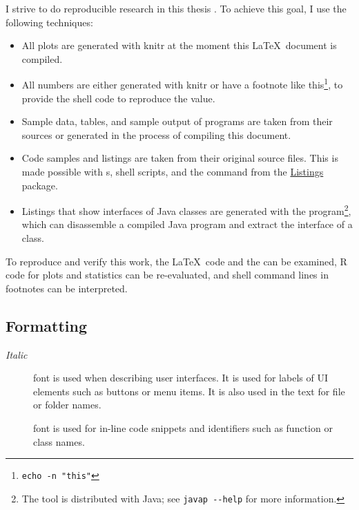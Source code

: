I strive to do reproducible research in this thesis
\citep{peng2011reproducible}.
To achieve this goal, I use the following techniques:

\begin{itemize}[noitemsep,nolistsep]

  \item All plots are generated with knitr \citep{knitr2:online} at the moment
    this \LaTeX~document is compiled.

  \item All numbers are either generated with knitr or have a footnote like
    this\footnote{\verb~echo -n "this"~\shellcmdline}, to provide the shell code
    to reproduce the value.

  \item Sample data, tables, and sample output of programs are taken from their
    sources or generated in the process of compiling this document.

  \item Code samples and listings are taken from their original source files.
    This is made possible with s, shell scripts, and the
    \verb|| command from the
    \href{https://www.ctan.org/pkg/listings}{Listings} package.

  \item Listings that show interfaces of Java classes are generated with the
     program\footnote{The  tool is distributed with
    Java; see \verb|javap --help| for more information.}, which can disassemble
    a compiled Java program and extract the interface of a class.

\end{itemize}

To reproduce and verify this work, the \LaTeX~code and the  can be
examined, R code for plots and statistics can be re-evaluated, and shell command
lines in footnotes can be interpreted.

\subsection{Formatting}

\begin{description}

  \item[\emph{Italic}] font is used when describing user interfaces.
    It is used for labels of \acs{UI} elements such as buttons or menu items.
    It is also used in the text for file or folder names.

  \item[] font is used for in-line code snippets and identifiers
    such as function or class names.

\end{description}
